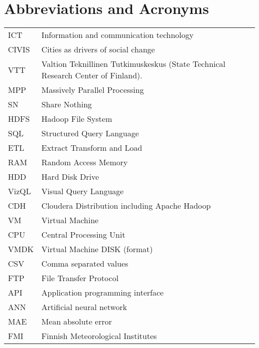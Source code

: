 \chapter*{Abbreviations and Acronyms}


\noindent
\begin{longtable}{@{}p{}p{}@{}}
ICT & Information and communication technology \\
CIVIS & Cities as drivers of social change \\ 
VTT & Valtion Teknillinen Tutkimuskeskus (State Technical Research Center of Finland). \\ 
MPP  & Massively Parallel Processing \\
SN & Share Nothing \\ 
HDFS & Hadoop File System\\
SQL & Structured Query Language\\
ETL & Extract Transform and Load\\
RAM & Random Access Memory\\
HDD & Hard Disk Drive\\
VizQL & Visual Query Language\\
CDH & Cloudera Distribution including Apache Hadoop\\
VM & Virtual Machine\\
CPU & Central Processing Unit\\
VMDK & Virtual Machine DISK (format)\\
CSV & Comma separated values\\
FTP & File Transfer Protocol\\
API & Application programming interface\\
ANN & Artificial neural network\\
MAE & Mean absolute error\\
FMI & Finnish Meteorological Institutes\\
\end{longtable}
